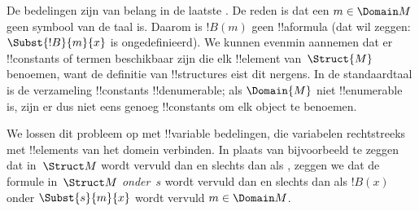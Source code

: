 \documentclass[openany]{memoir}
\begin{document}
\begin{explain}
De bedelingen zijn van belang in de laatste
. De reden is dat een $m \in
\Domain M$ geen symbool van de taal is. Daarom is $!B(m)$ geen
!!a{formula} (dat wil zeggen: $\Subst{!B}{m}{x}$ is ongedefinieerd). We
kunnen evenmin aannemen dat er !!{constant}s of termen beschikbaar zijn
die elk !!{element} van~$\Struct{M}$ benoemen, want de definitie van
!!{structure}s eist dit nergens. In de standaardtaal is de verzameling
!!{constant}s !!{denumerable}; als $\Domain{M}$ niet !!{enumerable} is,
zijn er dus niet eens genoeg !!{constant}s om elk object te benoemen.

We lossen dit probleem op met !!{variable} bedelingen, die variabelen
rechtstreeks met !!{element}s van het domein verbinden. In plaats van
bijvoorbeeld te zeggen dat
 in~$\Struct M$
wordt vervuld dan en slechts dan als , zeggen we dat de formule in~$\Struct M$
\emph{onder}~$s$ wordt vervuld dan en slechts dan als $!B(x)$ onder
$\Subst{s}{m}{x}$ wordt vervuld  $m \in \Domain M$.
\end{explain}
\end{document}
